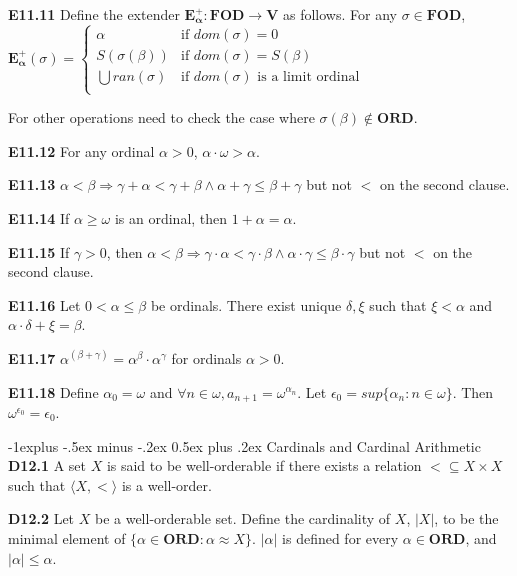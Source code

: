 \documentclass[10pt, landscape]{article}
\makeatletter
\renewcommand{\section}{\@startsection{section}{1}{0mm}%
                                {-1ex plus -.5ex minus -.2ex}%
                                {0.5ex plus .2ex}%
                                {\normalfont\large\bfseries}}
\renewcommand{\section}{\@startsection{section}{2}{0mm}%
                                {-1explus -.5ex minus -.2ex}%
                                {0.5ex plus .2ex}%
                                {\normalfont\normalsize\bfseries}}
\makeatother
\begin{document}
\begin{multicols*}{3}
\textbf{E11.11} Define the extender $\mathbf{E_\alpha^+:FOD\rightarrow V}$ as follows. For any $\sigma \in \mathbf{FOD}$, $\mathbf{E_\alpha^+}(\sigma) =
    \left\{
    \begin{array}{lr}
      \alpha & \text{if $dom(\sigma)=0$} \\
      S(\sigma(\beta)) & \text{if $dom(\sigma) =S(\beta)$} \\
      \bigcup ran(\sigma) & \text{if $dom(\sigma)$ is a limit ordinal} \\
    \end{array}
    \right.
    $
    
For other operations need to check the case where $\sigma(\beta)\notin\mathbf{ORD}$.

\textbf{E11.12} For any ordinal $\alpha>0$, $\alpha \cdot \omega > \alpha$.

\textbf{E11.13} $\alpha < \beta \Rightarrow \gamma + \alpha < \gamma +\beta \land \alpha + \gamma \leq \beta +\gamma$ but not $<$ on the second clause.

\textbf{E11.14} If $\alpha \geq \omega$ is an ordinal, then $1+\alpha=\alpha$.

\textbf{E11.15} If $\gamma > 0$, then $\alpha < \beta \Rightarrow \gamma \cdot \alpha < \gamma \cdot \beta \land \alpha \cdot \gamma \leq \beta \cdot \gamma$ but not $<$ on the second clause.

\textbf{E11.16} Let $0<\alpha\leq \beta$ be ordinals. There exist unique $\delta, \xi$ such that $\xi < \alpha$ and $\alpha\cdot\delta+\xi=\beta$.

\textbf{E11.17} $\alpha^{(\beta+\gamma)}=\alpha^\beta\cdot\alpha^\gamma$ for ordinals $\alpha>0$.

\textbf{E11.18} Define $\alpha_0=\omega$ and $\forall n \in \omega, a_{n+1}=\omega^{\alpha_n}$. Let $\epsilon_0=sup\{\alpha_n:n\in\omega\}$. Then $\omega^{\epsilon_0}=\epsilon_0$.

\section{Cardinals and Cardinal Arithmetic}
\textbf{D12.1} A set $X$ is said to be well-orderable if there exists a relation $<\subseteq X \times X$ such that $\langle X, < \rangle$ is a well-order.

\textbf{D12.2} Let $X$ be a well-orderable set. Define the cardinality of $X$, $|X|$, to be the minimal element of $\{\alpha\in\mathbf{ORD}:\alpha\approx X\}$. $|\alpha|$ is defined for every $\alpha\in\mathbf{ORD}$, and $|\alpha|\leq\alpha$.


\end{multicols*}
\end{document}
